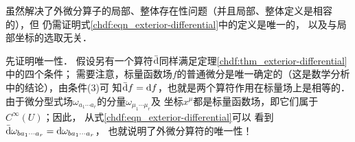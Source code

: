 虽然解决了外微分算子的局部、整体存在性问题（并且局部、整体定义是相容的），但
仍需证明式\eqref{chdf:eqn_exterior-differential}中的定义是唯一的，
以及与局部坐标的选取无关．

先证明唯一性．
假设另有一个算符$\bar{\rm d}$同样满足定理\ref{chdf:thm_exterior-differential}中的四个条件；
需要注意，标量函数场$f$的普通微分是唯一确定的（这是数学分析中的结论），由条件(3)可
知$\bar{\rm d} f = {\rm d}f$，也就是两个算符作用在标量场上是相等的．
由于微分型式场$\omega_{a_{1}\cdots a_{r}}$的分量$\omega_{\mu_{1}\cdots \mu_{r}}$及
坐标$x^{\mu}$都是标量函数场，即它们属于$C^\infty(U)$；因此，
从式\eqref{chdf:eqn_exterior-differential}可以
看到$\bar{\rm d}\omega_{b a_{1}\cdots a_{r}} = {\rm d}\omega_{b a_{1}\cdots a_{r}}$，
也就说明了外微分算符的唯一性！

